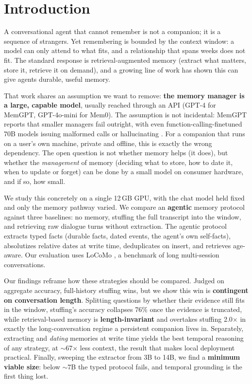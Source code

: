 \section{Introduction}
\label{sec:intro}

A conversational agent that cannot remember is not a companion; it is a
sequence of strangers. Yet remembering is bounded by the context window: a model
can only attend to what fits, and a relationship that spans weeks does not fit.
The standard response is retrieval-augmented memory (extract what matters, store
it, retrieve it on demand), and a growing line of work
\citep{packer2023memgpt,chhikara2025mem0,park2023generative} has shown this can
give agents durable, useful memory.

That work shares an assumption we want to remove: \textbf{the memory manager is a
large, capable model}, usually reached through an API (GPT-4 for MemGPT,
GPT-4o-mini for Mem0). The assumption is not incidental: MemGPT reports that
smaller managers fail outright, with even function-calling-finetuned 70B models
issuing malformed calls or hallucinating \citep{packer2023memgpt}. For a
companion that runs on a user's own machine, private and offline, this is exactly
the wrong dependency. The open question is not whether memory helps (it does), but
whether the \emph{management} of memory (deciding what to store, how to date it,
when to update or forget) can be done by a small model on consumer hardware, and
if so, how small.

We study this concretely on a single 12\,GB GPU, with the chat model held fixed
and only the memory pathway varied. We compare an \textbf{agentic} memory protocol
against three baselines: no memory, stuffing the full transcript into the window,
and retrieving raw dialogue turns without extraction. The agentic protocol
extracts typed facts (durable facts, dated events, the agent's own self-facts),
absolutizes relative dates at write time, deduplicates on insert, and retrieves
age-aware. Our evaluation uses LoCoMo \citep{maharana2024locomo}, a benchmark of
long multi-session conversations.

Our findings reframe how these strategies should be compared. Judged on
aggregate accuracy, full-history stuffing wins, but we show this win is
\textbf{contingent on conversation length}. Splitting questions by whether their
evidence still fits in the window, stuffing's accuracy collapses 76\% once the
evidence is truncated, while retrieval-based memory is \textbf{length-invariant}
and overtakes stuffing 2.0$\times$ in exactly the long-conversation regime a
persistent companion lives in. Separately, extracting and \emph{dating} memories at
write time yields the best temporal reasoning of any strategy, at
$\sim$67$\times$ less context, the result that makes local deployment practical.
Finally, sweeping the extractor from 3B to 14B, we find a \textbf{minimum viable
size}: below $\sim$7B the typed protocol fails, and temporal grounding is the
first thing lost.

